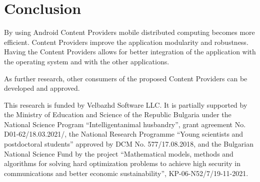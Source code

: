 \documentclass{ifacconf}
\begin{document}
\section{Conclusion}

By using Android Content Providers mobile distributed computing becomes more efficient. Content Providers improve the application modularity and robustness. Having the Content Providers allows for better integration of the application with the operating system and with the other applications. 

As further research, other consumers of the proposed Content Providers can be developed and approved.

\begin{ack}
This research is funded by Velbazhd Software LLC. It is partially supported by the Ministry of Education and Science of the Republic Bulgaria under the National Science Program “Intelligentanimal husbandry”, grant agreement No. D01-62/18.03.2021/, the National Research Programme “Young scientists and postdoctoral students” approved by DCM No. 577/17.08.2018, and the Bulgarian National Science Fund by the project “Mathematical models, methods and algorithms for solving hard optimization problems to achieve high security in communications and better economic sustainability”, KP-06-N52/7/19-11-2021.
\end{ack}


\end{document}
